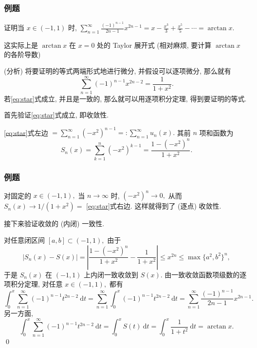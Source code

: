 
\begin{frame}
\frametitle{例题}

\begin{eg}
证明当 $x \in (-1, 1)$ 时, $\displaystyle \sum_{n=1}^\infty \frac{(-1)^{n-1}}{2n-1} x^{2n-1} = x - \frac{x^3}{3} + \frac{x^5}{5} - \cdots = \arctan x.$
\end{eg}

这实际上是 $\arctan x$ 在 $x = 0$ 处的 Taylor 展开式 (相对麻烦, 要计算 $\arctan x$ 的各阶导数)

\pause
\vspace{0.5em}

\startproof[bg=yellow, fg=red](分析)
将要证明的等式两端形式地进行微分, 并假设可以逐项微分, 那么就有
\begin{equation}
\sum_{n=1}^\infty (-1)^{n-1} x^{2n-2} = \frac{1}{1 + x^2}.
\tag{$\star$}
\label{eq:star}
\end{equation}
若\eqref{eq:star}式成立, 并且是一致的, 那么就可以用逐项积分定理, 得到要证明的等式.

\pause
\vspace{0.5em}

{\color{red}} 首先验证\eqref{eq:star}式成立, 即收敛性.

\eqref{eq:star}式左边 $= \displaystyle \sum_{n=1}^\infty (-x^2)^{n-1} =: \sum_{n=1}^\infty u_n(x).$ 其前 $n$ 项和函数为
\[
S_n(x) = \sum_{k=1}^n (-x^2)^{k-1} = \frac{1 - (-x^2)^n}{1 + x^2}.
\]

\end{frame}


\begin{frame}
\frametitle{例题}

对固定的 $x \in (-1, 1),$ 当 $n \to \infty$ 时, $(-x^2)^n \to 0,$ 从而 $S_n(x) \to 1/(1 + x^2) =$ \eqref{eq:star}式右边. 这样就得到了 (逐点) 收敛性.

\pause
\vspace{0.5em}

{\color{red}} 接下来验证收敛的 (内闭) 一致性.

对任意闭区间 $[a, b] \subset (-1, 1),$ 由于
\[
\left| S_n(x) - S(x) \right| = \left| \frac{1 - (-x^2)^n}{1 + x^2} - \frac{1}{1 + x^2} \right| \leqslant x^{2n} \leqslant \max \{ a^2, b^2 \}^n,
\]
于是 $S_n(x)$ 在 $(-1, 1)$ 上内闭一致收敛到 $S(x).$ 由一致收敛函数项级数的逐项积分定理, 对任意 $x \in (-1, 1),$ 都有
\[
\int_0^x \sum_{n=1}^\infty (-1)^{n-1} t^{2n-2} ~ \mathrm{d}t = \sum_{n=1}^\infty \int_0^x (-1)^{n-1} t^{2n-2} ~ \mathrm{d}t = \sum_{n=1}^\infty \frac{(-1)^{n-1}}{2n-1} x^{2n-1}.
\]
另一方面,
\[
\int_0^x \sum_{n=1}^\infty (-1)^{n-1} t^{2n-2} ~ \mathrm{d}t = \int_0^x S(t) ~ \mathrm{d}t = \int_0^x \frac{1}{1 + t^2} ~ \mathrm{d}t = \arctan x.
\]
\qed

\end{frame}

